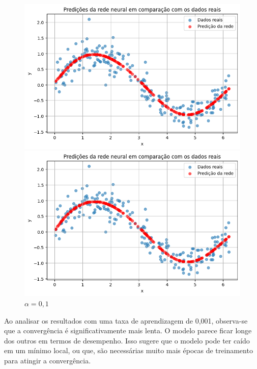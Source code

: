 \begin{figure}[htb]
\begin{minipage}{0.45\textwidth}
\includegraphics[width=\textwidth]{./0803_imgs/png-241110-175408844-13216912741484706107.png}
	\end{minipage}
	\hfill
	\begin{minipage}{0.45\textwidth}
		\centering
		\caption{$\alpha = 0,1$}\label{tarefa03:01:predicoes}
		\includegraphics[width=\textwidth]{./0803_imgs/png-241110-175801588-11785230830217735738.png}
	\end{minipage}
\end{figure}

Ao analisar os resultados com uma taxa de aprendizagem de 0,001, observa-se que 
a convergência é significativamente mais lenta. O modelo parece ficar longe dos 
outros em termos de desempenho. Isso sugere que o modelo pode ter caído em um 
mínimo local, ou que, são necessárias muito mais épocas de treinamento para 
atingir a convergência.

